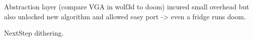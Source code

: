 \par

Abstraction layer (compare VGA in wolf3d to doom) incured small overhead but also unlocked new algorithm and allowed easy port -> even a fridge runs doom.\\
\par
NextStep dithering.\\
\\ 

